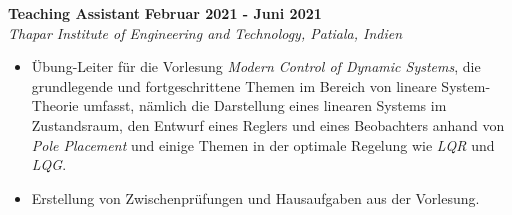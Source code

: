 	\large{\textbf{Teaching Assistant}}
	\hfill
	\large{\textbf{Februar 2021 - Juni 2021}}\\
	\emph{\large{Thapar Institute of Engineering and Technology, Patiala, Indien}}
	\begin{itemize}
		\item Übung-Leiter für die Vorlesung \emph{Modern Control of Dynamic Systems}, die grundlegende und fortgeschrittene Themen im Bereich von lineare System-Theorie umfasst, nämlich die Darstellung eines linearen Systems im Zustandsraum, den Entwurf eines Reglers und eines Beobachters anhand von \emph{Pole Placement} und einige Themen in der optimale Regelung wie \emph{LQR} und \emph{LQG}.
		\item Erstellung von Zwischenprüfungen und Hausaufgaben aus der Vorlesung.
	\end{itemize}
\fi




